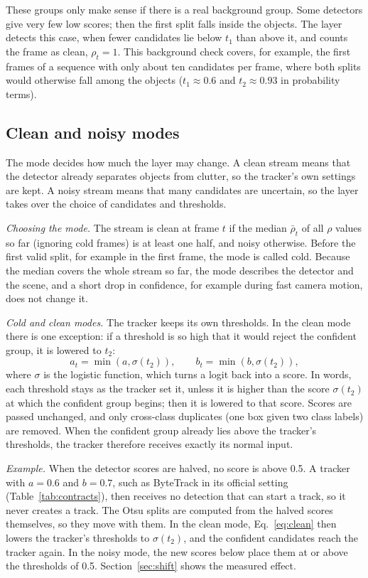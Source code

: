 \documentclass[pdflatex,sn-mathphys-num,iicol]{sn-jnl}
\begin{document}
These groups only make sense if there is a real background group. Some
detectors give very few low scores; then the first split falls inside the
objects. The layer detects this case, when fewer candidates lie below $t_1$
than above it, and counts the frame as clean, $\rho_t=1$. This background
check covers, for example, the first frames of a sequence with only about
ten candidates per frame, where both splits would otherwise fall among the
objects ($t_1\approx0.6$ and $t_2\approx0.93$ in probability terms).

\subsection{Clean and noisy modes}\label{sec:regimes}
The mode decides how much the layer may change. A clean stream means that
the detector already separates objects from clutter, so the tracker's own
settings are kept. A noisy stream means that many candidates are uncertain,
so the layer takes over the choice of candidates and thresholds.

\emph{Choosing the mode.} The stream is clean at frame $t$ if the median
$\bar\rho_t$ of all $\rho$ values so far (ignoring cold frames) is at least
one half, and noisy otherwise. Before the first valid split, for example in
the first frame, the mode is called cold. Because the median covers the whole
stream so far, the mode describes the detector and the scene, and a short
drop in confidence, for example during fast camera motion, does not change
it.

\emph{Cold and clean modes.} The tracker keeps its own thresholds. In the
clean mode there is one exception: if a threshold is so high that it would
reject the confident group, it is lowered to $t_2$:
\begin{equation}
a_t=\min\!\left(a,\sigma(t_2)\right),\qquad b_t=\min\!\left(b,\sigma(t_2)\right),
\label{eq:clean}
\end{equation}
where $\sigma$ is the logistic function, which turns a logit back into a
score. In words, each threshold stays as the tracker set it, unless it is
higher than the score $\sigma(t_2)$ at which the confident group begins; then
it is lowered to that score. Scores are passed unchanged, and only cross-class duplicates (one box
given two class labels) are removed. When the confident group already lies
above the tracker's thresholds, the tracker therefore receives exactly its
normal input.

\emph{Example.} When the detector scores are halved, no score is above 0.5.
A tracker with $a=0.6$ and $b=0.7$, such as ByteTrack in its official setting
(Table~\ref{tab:contracts}), then receives no detection that can start a
track, so it never creates a track. The Otsu splits are computed from the
halved scores themselves, so they move with them. In the clean mode,
Eq.~\eqref{eq:clean} then lowers the tracker's thresholds to $\sigma(t_2)$,
and the confident candidates reach the tracker again. In the noisy mode, the
new scores below place them at or above the thresholds of 0.5.
Section~\ref{sec:shift} shows the measured effect.
\end{document}
